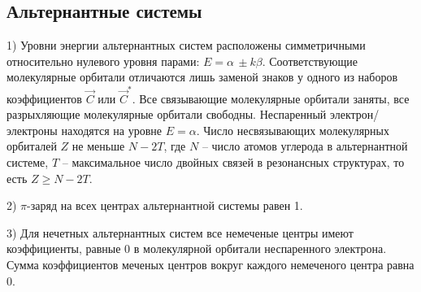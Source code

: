 \subsection{Альтернантные системы}
\vspace{1mm}
1) Уровни энергии альтернантных систем расположены симметричными относительно нулевого уровня парами: $E=\alpha\,\pm k\beta$. Соответствующие молекулярные орбитали
отличаются лишь заменой знаков у одного из наборов коэффициентов $\vec{C}$ или $\vec{C}^*$. Все связывающие молекулярные орбитали заняты, все разрыхляющие молекулярные орбитали свободны. Неспаренный электрон/электроны находятся на уровне $E=\alpha$. Число несвязывающих молекулярных орбиталей $Z$ не меньше $N-2T$, где $N$ – число атомов углерода в альтернантной системе, $T$ – максимальное число двойных связей в резонансных структурах, то есть $Z \geq N-2T$.

2) $\pi$-заряд на всех центрах альтернантной системы равен 1.

3) Для нечетных альтернантных систем все немеченые центры имеют коэффициенты, равные 0 в молекулярной орбитали неспаренного электрона. Сумма коэффициентов меченых центров вокруг каждого немеченого центра равна 0.

